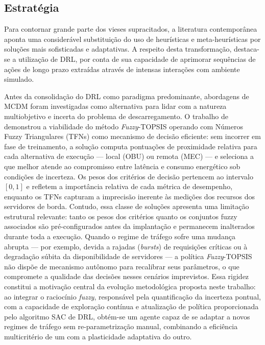\subsection{Estratégia}
Para contornar grande parte dos vieses supracitados, a literatura contemporânea aponta uma considerável substituição do uso de heurísticas e meta-heurísticas por soluções mais sofisticadas e adaptativas. A respeito desta transformação, destaca-se a utilização de \gls{DRL}, por conta de sua capacidade de aprimorar sequências de ações de longo prazo extraídas através de intensas interações com ambiente simulado.

Antes da consolidação do \gls{DRL} como paradigma predominante, abordagens de \gls{MCDM} foram investigadas como alternativa para lidar com a natureza multiobjetivo e incerta do problema de descarregamento. O trabalho de~ demonstrou a viabilidade do método \textit{Fuzzy}-\gls{TOPSIS} operando com Números Fuzzy Triangulares (TFNs) como mecanismo de decisão eficiente: sem incorrer em fase de treinamento, a solução computa pontuações de proximidade relativa para cada alternativa de execução --- local (\gls{OBU}) ou remota (\gls{MEC}) --- e seleciona a que melhor atende ao compromisso entre latência e consumo energético sob condições de incerteza. Os pesos dos critérios de decisão pertencem ao intervalo \(\left[0, 1\right]\) e refletem a importância relativa de cada métrica de desempenho, enquanto os TFNs capturam a imprecisão inerente às medições dos recursos dos servidores de borda. Contudo, essa classe de soluções apresenta uma limitação estrutural relevante: tanto os pesos dos critérios quanto os conjuntos fuzzy associados são pré-configurados antes da implantação e permanecem inalterados durante toda a execução. Quando o regime de tráfego sofre uma mudança abrupta --- por exemplo, devida a rajadas (\textit{bursts}) de requisições críticas ou à degradação súbita da disponibilidade de servidores --- a política \textit{Fuzzy}-\gls{TOPSIS} não dispõe de mecanismo autônomo para recalibrar seus parâmetros, o que compromete a qualidade das decisões nesses cenários imprevistos. Essa rigidez constitui a motivação central da evolução metodológica proposta neste trabalho: ao integrar o raciocínio \textit{fuzzy}, responsável pela quantificação da incerteza pontual, com a capacidade de exploração contínua e atualização de política proporcionada pelo algoritmo \gls{SAC} de \gls{DRL}, obtém-se um agente capaz de se adaptar a novos regimes de tráfego sem re-parametrização manual, combinando a eficiência multicritério de um com a plasticidade adaptativa do outro.

